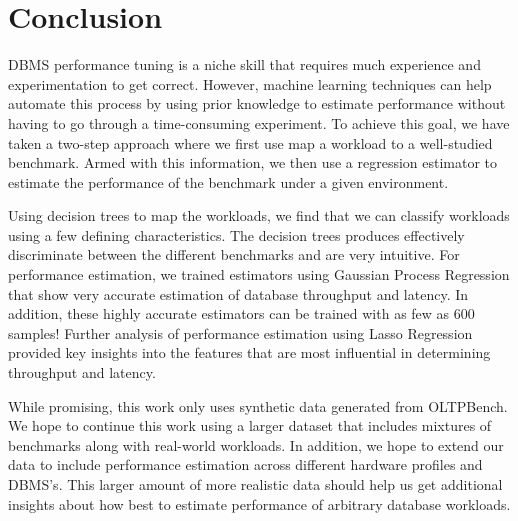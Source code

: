 \section{Conclusion} \label{sec:conclusion}

DBMS performance tuning is a niche skill that requires much experience
and experimentation to get correct. However, machine learning
techniques can help automate this process by using prior knowledge to
estimate performance without having to go through a time-consuming
experiment. To achieve this goal, we have taken a two-step approach
where we first use map a workload to a well-studied benchmark. Armed with
this information, we then use a regression estimator to estimate the
performance of the benchmark under a given environment.

Using decision trees to map the workloads, we find that we can
classify workloads using a few defining characteristics. The decision
trees produces effectively discriminate between the different
benchmarks and are very intuitive. For performance estimation, we trained estimators
using Gaussian Process Regression that show very accurate estimation
of database throughput and latency. In addition, these highly accurate
estimators can be trained with as few as 600 samples! Further analysis
of performance estimation using Lasso Regression provided key insights
into the features that are most influential in determining throughput
and latency.

While promising, this work only uses synthetic data generated from
OLTPBench. We hope to continue this work using a larger dataset that
includes mixtures of benchmarks along with real-world workloads. In
addition, we hope to extend our data to include performance
estimation across different hardware profiles and DBMS's. This larger
amount of more realistic data should help us get additional insights
about how best to estimate performance of arbitrary database workloads.